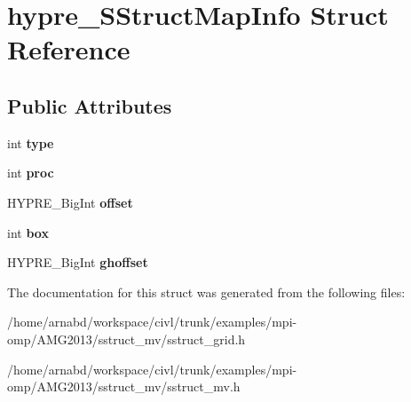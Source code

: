 \hypertarget{structhypre__SStructMapInfo}{}\section{hypre\+\_\+\+S\+Struct\+Map\+Info Struct Reference}
\label{structhypre__SStructMapInfo}
\subsection*{Public Attributes}
\begin{DoxyCompactItemize}
\item 
\hypertarget{structhypre__SStructMapInfo_a5388a769c482c3a36b83c3858b3af6a8}{}int {\bfseries type}\label{structhypre__SStructMapInfo_a5388a769c482c3a36b83c3858b3af6a8}

\item 
\hypertarget{structhypre__SStructMapInfo_af6c8a408627d2d5057a02a8202cd5b0a}{}int {\bfseries proc}\label{structhypre__SStructMapInfo_af6c8a408627d2d5057a02a8202cd5b0a}

\item 
\hypertarget{structhypre__SStructMapInfo_a9715b839b6d8b489065c6cb594257efe}{}H\+Y\+P\+R\+E\+\_\+\+Big\+Int {\bfseries offset}\label{structhypre__SStructMapInfo_a9715b839b6d8b489065c6cb594257efe}

\item 
\hypertarget{structhypre__SStructMapInfo_a10aff0aca0c5257278d45ed9a5b64ac2}{}int {\bfseries box}\label{structhypre__SStructMapInfo_a10aff0aca0c5257278d45ed9a5b64ac2}

\item 
\hypertarget{structhypre__SStructMapInfo_aef11a590487ed8b0390c07dfb93f9d71}{}H\+Y\+P\+R\+E\+\_\+\+Big\+Int {\bfseries ghoffset}\label{structhypre__SStructMapInfo_aef11a590487ed8b0390c07dfb93f9d71}

\end{DoxyCompactItemize}


The documentation for this struct was generated from the following files\+:\begin{DoxyCompactItemize}
\item 
/home/arnabd/workspace/civl/trunk/examples/mpi-\/omp/\+A\+M\+G2013/sstruct\+\_\+mv/sstruct\+\_\+grid.\+h\item 
/home/arnabd/workspace/civl/trunk/examples/mpi-\/omp/\+A\+M\+G2013/sstruct\+\_\+mv/sstruct\+\_\+mv.\+h\end{DoxyCompactItemize}
